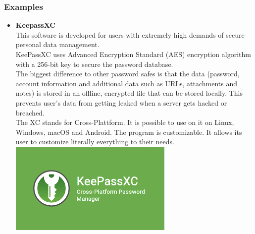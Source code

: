 \documentclass[conference]{IEEEtran}
\begin{document}
\subsubsection{Examples}
\begin{itemize}
\item \textbf{KeepassXC}\cite{b6}\\ 
This software is developed for users with extremely high demands of secure personal data management. \\
KeePassXC uses Advanced Encryption Standard (AES) encryption algorithm with a 256-bit key to secure the password database.\\
The biggest difference to other password safes is that the data (password, account information and additional data such as URLs, attachments and notes) is stored in an offline, encrypted file that can be stored locally. This prevents user's data from getting leaked when a server gets hacked or breached.\\
The XC stands for Cross-Plattform. It is possible to use on it on Linux, Windows, macOS and Android.
The program is customizable. It allows its user to customize literally everything to their needs.\\
\includegraphics[scale=0.77]{./images/KeePass.png}\\


\end{itemize}
\end{document}
